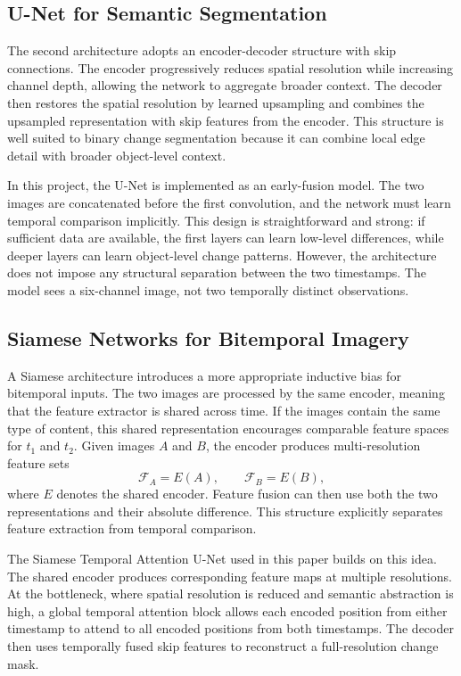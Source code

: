 \documentclass[11pt,a4paper]{article}
\begin{document}
\subsection{U-Net for Semantic Segmentation}

The second architecture adopts an encoder-decoder structure with skip connections. The encoder progressively reduces spatial resolution while increasing channel depth, allowing the network to aggregate broader context. The decoder then restores the spatial resolution by learned upsampling and combines the upsampled representation with skip features from the encoder. This structure is well suited to binary change segmentation because it can combine local edge detail with broader object-level context.

In this project, the U-Net is implemented as an early-fusion model. The two images are concatenated before the first convolution, and the network must learn temporal comparison implicitly. This design is straightforward and strong: if sufficient data are available, the first layers can learn low-level differences, while deeper layers can learn object-level change patterns. However, the architecture does not impose any structural separation between the two timestamps. The model sees a six-channel image, not two temporally distinct observations.

\subsection{Siamese Networks for Bitemporal Imagery}

A Siamese architecture introduces a more appropriate inductive bias for bitemporal inputs. The two images are processed by the same encoder, meaning that the feature extractor is shared across time. If the images contain the same type of content, this shared representation encourages comparable feature spaces for \(t_1\) and \(t_2\). Given images \(A\) and \(B\), the encoder produces multi-resolution feature sets
\begin{equation}
  \mathcal{F}_A = E(A), \qquad \mathcal{F}_B = E(B),
\end{equation}
where \(E\) denotes the shared encoder. Feature fusion can then use both the two representations and their absolute difference. This structure explicitly separates feature extraction from temporal comparison.

The Siamese Temporal Attention U-Net used in this paper builds on this idea. The shared encoder produces corresponding feature maps at multiple resolutions. At the bottleneck, where spatial resolution is reduced and semantic abstraction is high, a global temporal attention block allows each encoded position from either timestamp to attend to all encoded positions from both timestamps. The decoder then uses temporally fused skip features to reconstruct a full-resolution change mask.
\end{document}
